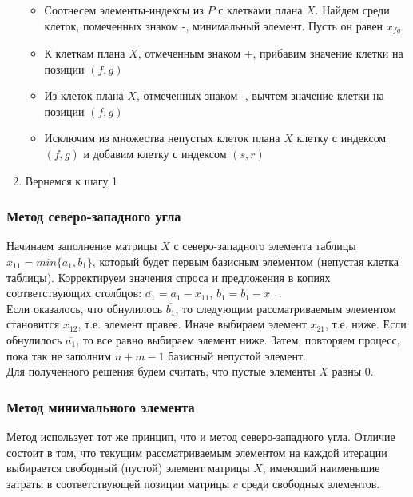 \begin{enumerate}
\begin{itemize}
		\item Соотнесем элементы-индексы из $P$ с клетками плана $X$. Найдем среди клеток, помеченных знаком -, минимальный элемент. Пусть он равен $x_{fg}$
		
		\item К клеткам плана $X$, отмеченным знаком +, прибавим значение клетки на позиции $(f,g)$
		
		\item Из клеток плана $X$, отмеченных знаком -, вычтем значение клетки на позиции $(f,g)$
		
		\item Исключим из множества непустых клеток плана $X$ клетку с индексом $(f,g)$ и добавим клетку с индексом $(s,r)$
	\end{itemize}
	
	\item Вернемся к шагу 1
	
\end{enumerate}

\subsubsection{Метод северо-западного угла}
Начинаем заполнение матрицы $X$ с северо-западного элемента таблицы $x_{11}=min\{a_1,b_1\}$, который будет первым базисным элементом (непустая клетка таблицы). Корректируем значения спроса и предложения в копиях соответствующих столбцов: $\overline{a_1}=a_1-x_{11}$, $\overline{b_1}=b_1-x_{11}$. \\
Если оказалось, что обнулилось $\overline{b_1}$, то следующим рассматриваемым элементом становится $x_{12}$, т.е. элемент правее. Иначе выбираем элемент $x_{21}$, т.е. ниже. Если обнулилось $\overline{a_1}$, то все равно выбираем элемент ниже. Затем, повторяем процесс, пока так не заполним $n+m-1$ базисный непустой элемент. \\
Для полученного решения будем считать, что пустые элементы $X$ равны 0.

\subsubsection{Метод минимального элемента}
Метод использует тот же принцип, что и метод северо-западного угла. Отличие состоит в том, что текущим рассматриваемым элементом на каждой итерации выбирается свободный (пустой) элемент матрицы $X$, имеющий наименьшие затраты в соответствующей позиции матрицы $c$ среди свободных элементов.

